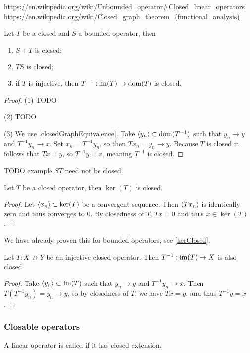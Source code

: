 \url{https://en.wikipedia.org/wiki/Unbounded_operator#Closed_linear_operators}
\url{https://en.wikipedia.org/wiki/Closed_graph_theorem_(functional_analysis)}

\begin{proposition} \label{algebraClosedOperators}
Let $T$ be a closed and $S$ a bounded operator, then
\begin{enumerate}
\item $S+T$ is closed;
\item $TS$ is closed;
\item if $T$ is injective, then $T^{-1}: \operatorname{im}(T) \to \operatorname{dom}(T)$ is closed.
\end{enumerate}
\end{proposition}
\begin{proof}
(1) TODO

(2) TODO

(3) We use \ref{closedGraphEquivalence}. Take $\left\langle y_n \right\rangle\subset \operatorname{dom}(T^{-1})$ such that $y_n\to y$ and $T^{-1}y_n\to x$. Set $x_n = T^{-1}y_n$, so then $Tx_n = y_n\to y$. Because $T$ is closed it follows that $Tx = y$, so $T^{-1}y = x$, meaning $T^{-1}$ is closed.
\end{proof}
TODO example $ST$ need not be closed.

\begin{lemma}
Let $T$ be a closed operator, then $\ker(T)$ is closed.
\end{lemma}
\begin{proof}
Let $\left\langle x_n \right\rangle\subset\ker(T)$ be a convergent sequence. Then $\left\langle Tx_n \right\rangle$ is identically zero and thus converges to $0$. By closedness of $T$, $Tx = 0$ and thus $x\in\ker(T)$. 
\end{proof}
We have already proven this for bounded operators, see \ref{kerClosed}.

\begin{lemma}
Let $T:X\not\to Y$ be an injective closed operator. Then $T^{-1}:\operatorname{im}(T)\to X$ is also closed.
\end{lemma}
\begin{proof}
Take $\left\langle y_n \right\rangle\subset \operatorname{im}(T)$ such that $y_n\to y$ and $T^{-1}y_n \to x$. Then $T(T^{-1}y_n) = y_n \to y$, so by closedness of $T$, we have $Tx = y$, and thus $T^{-1}y = x$.
\end{proof}

\subsubsection{Closable operators}
\begin{definition}
A linear operator is called  if it has closed extension.
\end{definition}

